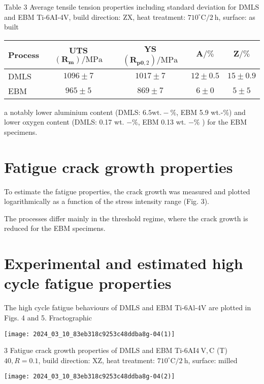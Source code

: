 \documentclass[10pt]{article}
\begin{document}
Table 3 Average tensile tension properties including standard deviation for DMLS and EBM Ti-6AI-4V, build direction: $\mathrm{ZX}$, heat treatment: $710^{\circ} \mathrm{C} / 2 \mathrm{~h}$, surface: as built

\begin{center}
\begin{tabular}{lcccc}
\hline
Process & UTS $\left(\boldsymbol{R}_{\mathbf{m}}\right) / \mathrm{MPa}$ & YS $\left(\boldsymbol{R}_{\mathbf{p} \mathbf{0}, 2}\right) / \mathrm{MPa}$ & $\boldsymbol{A} / \%$ & $\boldsymbol{Z} / \%$ \\
\hline
DMLS & $1096 \pm 7$ & $1017 \pm 7$ & $12 \pm 0.5$ & $15 \pm 0.9$ \\
EBM & $965 \pm 5$ & $869 \pm 7$ & $6 \pm 0$ & $5 \pm 5$ \\
\hline
\end{tabular}
\end{center}

a notably lower aluminium content (DMLS: $6.5 \mathrm{wt} .-\%$, EBM 5.9 wt.-\%) and lower oxygen content (DMLS: 0.17 wt. $-\%$, EBM 0.13 wt. $-\%$ ) for the EBM specimens.

\section*{Fatigue crack growth properties}
To estimate the fatigue properties, the crack growth was measured and plotted logarithmically as a function of the stress intensity range (Fig. 3).

The processes differ mainly in the threshold regime, where the crack growth is reduced for the EBM specimens.

\section*{Experimental and estimated high cycle fatigue properties}
The high cycle fatigue behaviours of DMLS and EBM Ti-6Al-4V are plotted in Figs. 4 and 5. Fractographic

\begin{center}
\texttt{[image: 2024\_03\_10\_83eb318c9253c48ddba8g-04(1)]}
\end{center}

3 Fatigue crack growth properties of DMLS and EBM Ti-6AI$4 \mathrm{~V}, \mathrm{C}$ (T) $40, R=0.1$, build direction: XZ, heat treatment: $710^{\circ} \mathrm{C} / 2 \mathrm{~h}$, surface: milled

\begin{center}
\texttt{[image: 2024\_03\_10\_83eb318c9253c48ddba8g-04(2)]}
\end{center}
\end{document}
